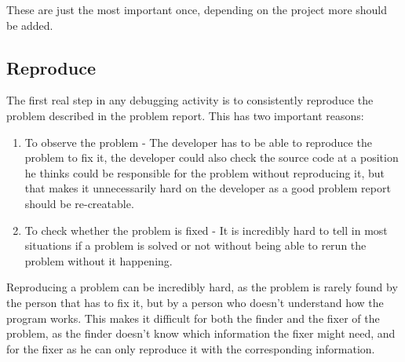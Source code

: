 These are just the most important once, depending on the project more should be added.

\subsection{Reproduce}
\label{aodZellerReproduce}
The first real step in any debugging activity is to consistently reproduce the problem described in the problem report. This has two important reasons:

\begin{enumerate}
  \item To observe the problem - The developer has to be able to reproduce the problem to fix it, the developer could also check the source code at a position he thinks could be responsible for the problem without reproducing it, but that makes it unnecessarily hard on the developer as a good problem report should be re-creatable.
  \item To check whether the problem is fixed - It is incredibly hard to tell in most situations if a problem is solved or not without being able to rerun the problem without it happening.
\end{enumerate}

Reproducing a problem can be incredibly hard, as the problem is rarely found by the person that has to fix it, but by a person who doesn't understand how the program works. This makes it difficult for both the finder and the fixer of the problem, as the finder doesn't know which information the fixer might need, and for the fixer as he can only reproduce it with the corresponding information.

